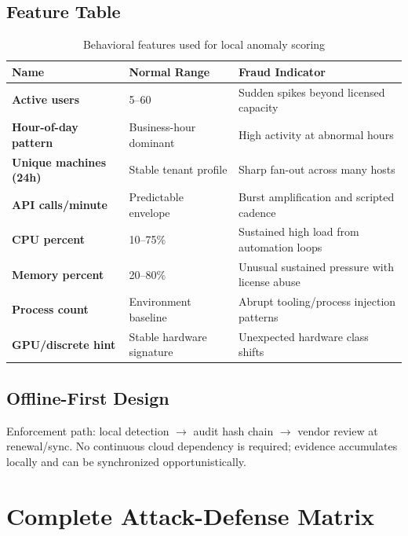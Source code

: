 \documentclass[11pt,a4paper]{article}
\begin{document}
\subsection{Feature Table}
\begin{table}[H]
\centering
\caption{Behavioral features used for local anomaly scoring}
\begin{tabularx}{\textwidth}{>{\bfseries}lYY}
\toprule
Name & Normal Range & Fraud Indicator \\
\midrule
Active users & 5--60 & Sudden spikes beyond licensed capacity \\
Hour-of-day pattern & Business-hour dominant & High activity at abnormal hours \\
Unique machines (24h) & Stable tenant profile & Sharp fan-out across many hosts \\
API calls/minute & Predictable envelope & Burst amplification and scripted cadence \\
CPU percent & 10--75\% & Sustained high load from automation loops \\
Memory percent & 20--80\% & Unusual sustained pressure with license abuse \\
Process count & Environment baseline & Abrupt tooling/process injection patterns \\
GPU/discrete hint & Stable hardware signature & Unexpected hardware class shifts \\
\bottomrule
\end{tabularx}
\end{table}

\subsection{Offline-First Design}
Enforcement path: local detection $\rightarrow$ audit hash chain $\rightarrow$ vendor review at renewal/sync. No continuous cloud dependency is required; evidence accumulates locally and can be synchronized opportunistically.

\section{Complete Attack-Defense Matrix}
\end{document}
